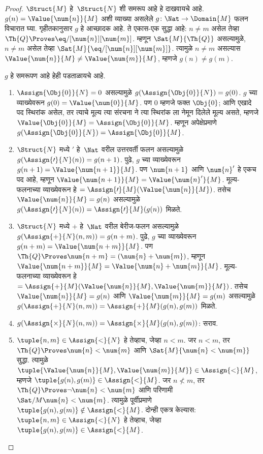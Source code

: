 \begin{proof}
$\Struct{M}$ हे~$\Struct{N}$ शी समरूप आहे हे दाखवायचे आहे.
$g(n) = \Value{\num{n}}{M}$ अशी व्याख्या असलेले
$g\colon \Nat \to \Domain{M}$ फलन विचारात घ्या. गृहीतकानुसार $g$ हे
आच्छादक आहे. ते एकास-एक सुद्धा आहे: $n \neq m$ असेल तेव्हा
$\Th{Q} \Proves \eq/[\num{n}][\num{m}]$. म्हणून
$\Sat{M}{\Th{Q}}$ असल्यामुळे, $n \neq m$ असेल तेव्हा
$\Sat{M}{\eq/[\num{n}][\num{m}]}$. त्यामुळे $n \neq m$ असल्यास
$\Value{\num{n}}{M} \neq \Value{\num{m}}{M}$, म्हणजे $g(n) \neq g(m)$.

$g$ हे समरूपण आहे हेही पडताळायचे आहे.
\begin{enumerate}
\item $\Assign{\Obj{0}}{N} = 0$ असल्यामुळे
  $g(\Assign{\Obj{0}}{N}) = g(0)$. $g$ च्या व्याख्येवरून
  $g(0) = \Value{\num{0}}{M}$. पण $\num{0}$ म्हणजे फक्त $\Obj{0}$;
  आणि एखादे पद स्थिरांक असेल, तर त्याचे मूल्य त्या संरचना ने
  त्या स्थिरांक ला नेमून दिलेले मूल्य असते, म्हणजे
  $\Value{\Obj{0}}{M} = \Assign{\Obj{0}}{M}$. म्हणून अपेक्षेप्रमाणे
  $g(\Assign{\Obj{0}}{N}) = \Assign{\Obj{0}}{M}$.
\item $\Struct{N}$ मध्ये $\prime$ हे~$\Nat$ वरील उत्तरवर्ती फलन असल्यामुळे
  $g(\Assign{\prime}{N}(n)) = g(n+1)$. पुढे, $g$ च्या व्याख्येवरून
  $g(n+1) = \Value{\num{n+1}}{M}$. पण $\num{n+1}$ आणि $\num{n}'$ हे
  एकच पद आहे, म्हणून $\Value{\num{n+1}}{M} = \Value{\num{n}'}{M}$.
  मूल्य-फलनाच्या व्याख्येवरून हे
  $= \Assign{\prime}{M}(\Value{\num{n}}{M})$. तसेच
  $\Value{\num{n}}{M} = g(n)$ असल्यामुळे
  $g(\Assign{\prime}{N}(n)) = \Assign{\prime}{M}(g(n))$ मिळते.
\item $\Struct{N}$ मध्ये $+$ हे~$\Nat$ वरील बेरीज-फलन असल्यामुळे
  $g(\Assign{+}{N}(n,m)) = g(n+m)$. पुढे, $g$ च्या व्याख्येवरून
  $g(n+m) = \Value{\num{n+m}}{M}$. पण $\Th{Q} \Proves
  \num{n+m} = (\num{n} + \num{m})$, म्हणून $\Value{\num{n+m}}{M} =
  \Value{\num{n}+\num{m}}{M}$. मूल्य-फलनाच्या व्याख्येवरून हे $=
  \Assign{+}{M}(\Value{\num{n}}{M},\Value{\num{m}}{M})$. तसेच
  $\Value{\num{n}}{M} = g(n)$ आणि $\Value{\num{m}}{M} = g(m)$ असल्यामुळे
  $g(\Assign{+}{N}(n, m)) = \Assign{+}{M}(g(n), g(m))$ मिळते.
\item $g(\Assign{\times}{N}(n, m)) = \Assign{\times}{M}(g(n), g(m))$:
  सराव.
\item $\tuple{n,m} \in \Assign{<}{N}$ हे तेव्हाच, जेव्हा $n < m$. जर
  $n < m$, तर $\Th{Q} \Proves \num{n} < \num{m}$ आणि
  $\Sat{M}{\num{n} < \num{m}}$ सुद्धा. त्यामुळे
  $\tuple{\Value{\num{n}}{M}, \Value{\num{m}}{M}} \in \Assign{<}{M}$,
  म्हणजे $\tuple{g(n), g(m)} \in \Assign{<}{M}$. जर $n \not< m$, तर
  $\Th{Q} \Proves \lnot \num{n} < \num{m}$ आणि परिणामी
  $\Sat/{M}{\num{n} < \num{m}}$. त्यामुळे पूर्वीप्रमाणे
  $\tuple{g(n), g(m)} \notin \Assign{<}{M}$. दोन्ही एकत्र केल्यास:
  $\tuple{n,m} \in \Assign{<}{N}$ हे तेव्हाच, जेव्हा
  $\tuple{g(n), g(m)} \in \Assign{<}{M}$.
\end{enumerate}
\end{proof}

